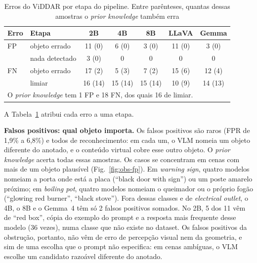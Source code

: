 \documentclass[conference]{IEEEtran}
\begin{document}
\begin{table}[!t]
\renewcommand{\arraystretch}{1.05}
\caption{Erros do ViDDAR por etapa do pipeline. Entre parênteses, quantas dessas amostras o \emph{prior
knowledge} também erra}
\label{tab:obs-causas}
\centering
\footnotesize
\setlength{\tabcolsep}{3.2pt}
\begin{tabular}{llccccc}
\toprule
Erro & Etapa & 2B & 4B & 8B & LLaVA & Gemma \\
\midrule
FP & objeto errado & 11 (0) & 6 (0) & 3 (0) & 11 (0) & 3 (0) \\
\midrule
\multirow{3}{*}{FN} & nada detectado & 3 (0) & 0 & 0 & 0 & 0 \\
 & objeto errado & 17 (2) & 5 (3) & 7 (2) & 15 (6) & 12 (4) \\
 & limiar & 16 (14) & 15 (14) & 15 (14) & 10 (9) & 14 (13) \\
\bottomrule
\multicolumn{7}{l}{\scriptsize O \emph{prior knowledge} tem 1 FP e 18 FN, dos quais 16 de limiar.}
\end{tabular}
\end{table}

A Tabela~\ref{tab:obs-causas} atribui cada erro a uma etapa.

\textbf{Falsos positivos: qual objeto importa.} Os falsos positivos são raros (FPR de 1,9\% a 6,8\%) e
todos de reconhecimento: em cada um, o VLM nomeia um objeto diferente do anotado, e o conteúdo virtual
cobre esse outro objeto. O \emph{prior knowledge} acerta todas essas amostras. Os casos se concentram em
cenas com mais de um objeto plausível (Fig.~\ref{fig:obs-fp}). Em \emph{warning sign}, quatro modelos
nomeiam a porta onde está a placa (``black door with sign'') ou um poste amarelo próximo; em
\emph{boiling pot}, quatro modelos nomeiam o queimador ou o próprio fogão (``glowing red burner'',
``black stove''). Fora dessas classes e de \emph{electrical outlet}, o 4B, o 8B e o Gemma~4 têm só 2
falsos positivos somados. No 2B, 5 dos 11 vêm de ``red box'', cópia do exemplo do prompt e a resposta
mais frequente desse modelo (36 vezes), numa classe que não existe no dataset. Os falsos positivos da
obstrução, portanto, não vêm de erro de percepção visual nem da geometria, e sim de uma escolha que o
prompt não especifica: em cenas ambíguas, o VLM escolhe um candidato razoável diferente do anotado.
\end{document}

